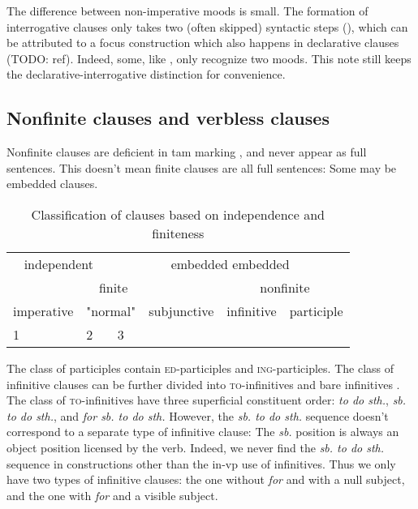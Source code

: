 \documentclass[UTF8, a4paper, oneside, scheme=plain]{ctexrep}
\newcommand*{\citesec}[1]{\S~{#1}}
\newcommand*{\citechap}[1]{Ch~{#1}}
\newcommand*{\citepage}[1]{p.~{#1}}
\newcommand{\corpus}[1]{\emph{#1}}
\newcommand{\corpuscat}[1]{\textsc{#1}}
\begin{document}
The difference between non-imperative moods is small.
The formation of interrogative clauses 
only takes two (often skipped) syntactic steps 
(),
which can be attributed to a focus construction which also happens in declarative clauses (TODO: ref).
Indeed, some, like \citet[\citepage{25}]{dixon2005semantic}, only recognize two moods.
This note still keeps the declarative-interrogative distinction 
for convenience.

\subsection{Nonfinite clauses and verbless clauses}\label{sec:simple-clause.nonfinite-clause}

Nonfinite clauses are deficient in \acs{tam} marking 
\citep[\citepage{1174}, {[5-7]}]{cgel},
and never appear as full sentences.
This doesn't mean finite clauses are all full sentences:
Some may be embedded clauses.

\begin{table}[H]
    \caption{Classification of clauses based on independence and finiteness}
    \centering
    \begin{tabular}{@{}llllll@{}}
        \toprule
        \multicolumn{2}{c}{independent}            & \multicolumn{4}{c}{embedded embedded}                                                                \\ \cmidrule(lr){1-2} \cmidrule(lr){3-6}
        \multicolumn{4}{c}{finite}                                                                & \multicolumn{2}{c}{nonfinite}                         \\ \cmidrule(lr){1-4} \cmidrule(lr){5-6}
        imperative               & \multicolumn{2}{c}{"normal"} & subjunctive & infinitive           & participle \\ \midrule
        1    &     2            &   3         &                                 &  &                                \\ \bottomrule
    \end{tabular}
\end{table}

The class of participles contain \corpuscat{ed}-participles and \corpuscat{ing}-participles.
The class of infinitive clauses can be further divided into 
\corpuscat{to}-infinitives and bare infinitives \citet[\citechap{14}, \citesec{1.4.3}]{cgel}.
The class of \corpuscat{to}-infinitives have three superficial constituent order:
\corpus{to do sth.}, \corpus{sb. to do sth.}, and \corpus{for sb. to do sth.}
However, the \corpus{sb. to do sth.} sequence doesn't correspond to a separate type of infinitive clause:
The \corpus{sb.} position is always an object position licensed by the verb.
Indeed, we never find the \corpus{sb. to do sth.} sequence
in constructions other than the in-\acs{vp} use of infinitives.
Thus we only have two types of infinitive clauses:
the one without \corpus{for} and with a null subject,
and the one with \corpus{for} and a visible subject.
\end{document}

